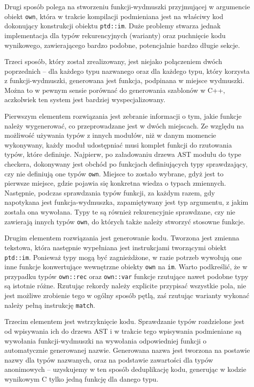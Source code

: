 \documentclass[licencjacka]{pracamgr}
\begin{document}
Drugi sposób polega na stworzeniu funkcji-wydmuszki przyjmującej w argumencie obiekt \texttt{own}, która w trakcie kompilacji podmieniana jest na właściwy kod dokonujący konstrukcji obiektu \texttt{ptd::im}.
Duże problemy stwarza jednak implementacja dla typów rekurencyjnych (warianty) oraz puchnięcie kodu wynikowego, zawierającego bardzo podobne, potencjalnie bardzo długie sekcje.

Trzeci sposób, który został zrealizowany, jest niejako połączeniem dwóch poprzednich -- dla każdego typu
nazwanego oraz dla każdego typu, który korzysta z funkcji-wydmuszki, generowana jest funkcja,
podpinana w miejsce wydmuszki. Można to w pewnym sensie porównać do generowania szablonów w C++, aczkolwiek ten system jest bardziej wyspecjalizowany.

Pierwszym elementem rozwiązania jest zebranie informacji o tym, jakie funkcje należy wygenerować,
co przeprowadzane jest w dwóch miejscach.
Ze względu na możliwość używania typów z innych modułów, niż w danym momencie wykonywany, każdy moduł udostępniać musi komplet funkcji do rzutowania typów, które definiuje.
Najpierw, po załadowaniu drzewa AST modułu do type checkera, dokonywany jest obchód po funkcjach definiujących typy sprawdzający, czy nie definiują one typów \texttt{own}.
Miejsce to zostało wybrane, gdyż jest to pierwsze miejsce, gdzie pojawia się konkretna wiedza o typach zmiennych.
Następnie, podczas sprawdzania typów funkcji, za każdym razem, gdy napotykana jest funkcja-wydmuszka, zapamiętywany jest typ argumentu, z jakim została ona wywołana.
Typy te są również rekurencyjnie sprawdzane, czy nie zawierają innych typów \texttt{own}, do których także należy stworzyć stosowne funkcje.

Drugim elementem rozwiązania jest generowanie kodu. Tworzona jest zmienna tekstowa, która następnie wypełniana jest instrukcjami tworzącymi obiekt \texttt{ptd::im}.
Ponieważ typy mogą być zagnieżdżone, w razie potrzeb wywołują one inne funkcje konwertujące wewnętrzne obiekty \texttt{own} na \texttt{im}.
Warto podkreślić, że w przypadku typów \texttt{own::rec} oraz \texttt{own::var} funkcje rzutujące nawet podobne typy są istotnie różne.
Rzutując rekordy należy explicite przypisać wszystkie pola, nie jest możliwe zrobienie tego w ogólny sposób pętlą, zaś rzutując warianty
wykonać należy pełną instrukcję \texttt{match}.

Trzecim elementem jest wstrzyknięcie kodu. Sprawdzanie typów rozdzielone jest od wpisywania ich do drzewa AST
i w trakcie tego wpisywania podmieniane są wywołania funkcji-wydmuszki na wywołania
odpowiedniej funkcji o automatycznie generowanej nazwie. Generowana nazwa jest tworzona na postawie nazwy dla typów nazwanych, oraz na podstawie zawartości
dla typów anonimowych -- uzyskujemy w ten sposób deduplikację kodu, generując w kodzie wynikowym C tylko jedną funkcję dla danego typu.
\end{document}
